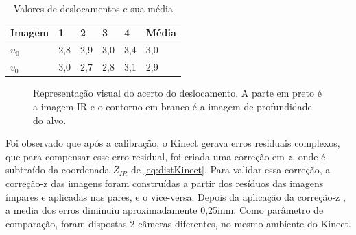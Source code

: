 \begin{table}[!h]
\centering
\caption{Valores de deslocamentos e sua média}
\label{tab:deslocamentoKinect}
\begin{tabular}{|l|l|l|l|l|l|}
\hline
Imagem & 1   & 2   & 3   & 4   & Média \\ \hline
$u_0$  & 2,8 & 2,9 & 3,0 & 3,4 & 3,0   \\ \hline
$v_0$  & 3,0 & 2,7 & 2,8 & 3,1 & 2,9   \\ \hline
\end{tabular}
\end{table}

\begin{figure}[!h]
	\centering
	\caption{%
	Representação visual do acerto do deslocamento. A parte em preto é a imagem IR e o contorno em branco é a imagem de profundidade do alvo.
	}\label{fig:deslocKinect}
\end{figure}

Foi observado que após a calibração, o Kinect gerava erros residuais complexos, que para compensar esse erro residual, foi criada uma correção em $z$, onde é subtraído da coordenada $Z_{IR}$ de \ref{eq:distKinect}.
Para validar essa correção, a correção-z das imagens foram construídas a partir dos resíduos das imagens ímpares e aplicadas nas pares, e o vice-versa. Depois da aplicação da correção-z , a media dos erros diminuiu aproximadamente 0,25mm.
Como parâmetro de comparação, foram dispostas 2 câmeras diferentes, no mesmo ambiente do Kinect.


